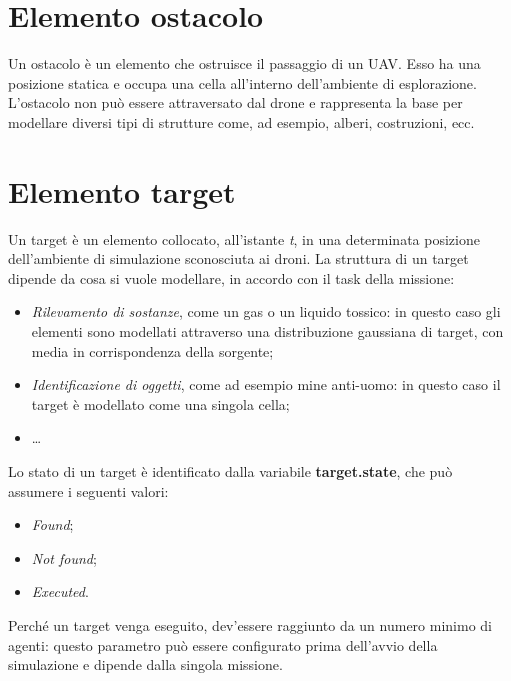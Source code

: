 \section{Elemento ostacolo}

Un ostacolo è un elemento che ostruisce il passaggio di un UAV. 
Esso ha una posizione statica e occupa una cella all’interno dell’ambiente di esplorazione. 
L’ostacolo non può essere attraversato dal drone e rappresenta la base per modellare diversi tipi di strutture come, ad esempio, alberi, costruzioni, ecc.

\section {Elemento target} \label{elemento_target}

Un target è un elemento collocato, all'istante \textit{t}, in una determinata posizione dell’ambiente di simulazione sconosciuta ai droni. 
La struttura di un target dipende da cosa si vuole modellare, in accordo con il task della missione:

\begin{itemize}
    \item \textit{Rilevamento di sostanze}, come un gas o un liquido tossico: in questo caso gli elementi sono modellati attraverso una distribuzione gaussiana di target, con media in corrispondenza della sorgente;
    \item \textit{Identificazione di oggetti}, come ad esempio mine anti-uomo: in questo caso il target è modellato come una singola cella;
    \item \dots
\end{itemize}

Lo stato di un target è identificato dalla variabile \textbf{target.state}, che può assumere i seguenti valori:

\begin{itemize}
    \item \textit{Found};
    \item \textit{Not found};
    \item \textit{Executed}.
\end{itemize}

Perché un target venga eseguito, dev'essere raggiunto da un numero minimo di agenti: questo parametro può essere configurato prima dell'avvio della simulazione e dipende dalla singola missione.

